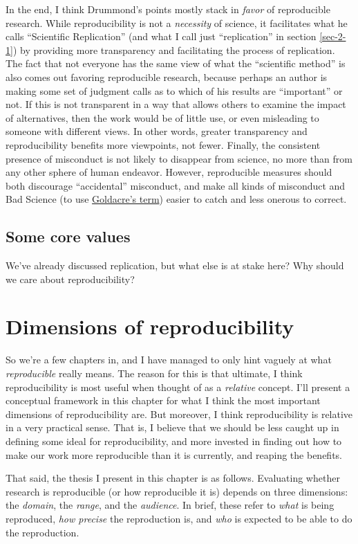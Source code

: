 \documentclass{book}
\begin{document}
In the end, I think Drummond's points mostly stack in \emph{favor} of reproducible research. While reproducibility is not a \emph{necessity} of science, it facilitates what he calls ``Scientific Replication'' (and what I call just ``replication'' in section \ref{sec-2-1}) by providing more transparency and facilitating the process of replication. The fact that not everyone has the same view of what the ``scientific method'' is also comes out favoring reproducible research, because perhaps an author is making some set of judgment calls as to which of his results are ``important'' or not. If this is not transparent in a way that allows others to examine the impact of alternatives, then the work would be of little use, or even misleading to someone with different views. In other words, greater transparency and reproducibility benefits more viewpoints, not fewer. Finally, the consistent presence of misconduct is not likely to disappear from science, no more than from any other sphere of human endeavor. However, reproducible measures should both discourage ``accidental'' misconduct, and make all kinds of misconduct and Bad Science (to use \href{http://www.badscience.net/}{Goldacre's term}) easier to catch and less onerous to correct.
\section{Some core values}
\label{sec-2-5}

We've already discussed replication, but what else is at stake here? Why should we care about reproducibility?
\chapter{Dimensions of reproducibility}
\label{sec-3}
\label{dimensions}

So we're a few chapters in, and I have managed to only hint vaguely at what \emph{reproducible} really means.  The reason for this is that ultimate, I think reproducibility is most useful when thought of as a \emph{relative} concept. I'll present a conceptual framework in this chapter for what I think the most important dimensions of reproducibility are. But moreover, I think reproducibility is relative in a very practical sense. That is, I believe that we should be less caught up in defining some ideal for reproducibility, and more invested in finding out how to make our work more reproducible than it is currently, and reaping the benefits.

That said, the thesis I present in this chapter is as follows. Evaluating whether research is reproducible (or how reproducible it is) depends on three dimensions: the \emph{domain}, the \emph{range}, and the \emph{audience}.  In brief, these refer to \emph{what} is being reproduced, \emph{how precise} the reproduction is, and \emph{who} is expected to be able to do the reproduction. 
\end{document}

